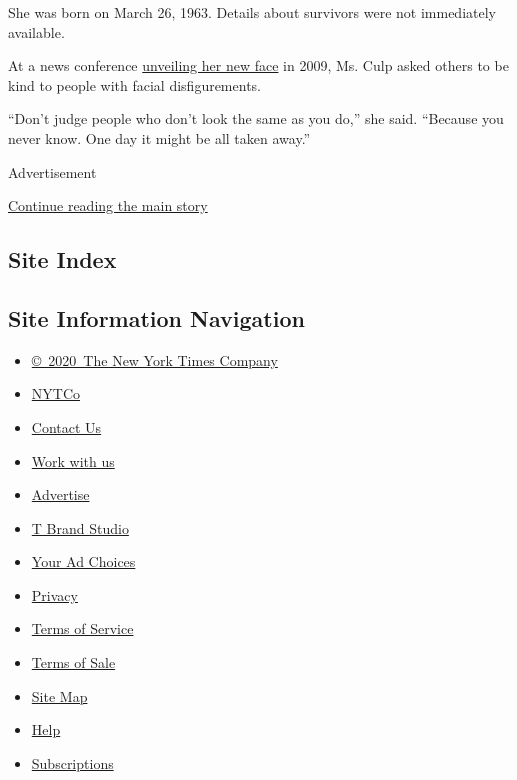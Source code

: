She was born on March 26, 1963. Details about survivors were not
immediately available.

At a news conference
\href{https://www.nytimes.com/2009/05/06/science/06face.html}{unveiling
her new face} in 2009, Ms. Culp asked others to be kind to people with
facial disfigurements.

``Don't judge people who don't look the same as you do,'' she said.
``Because you never know. One day it might be all taken away.''

Advertisement

\protect\hyperlink{after-bottom}{Continue reading the main story}

\hypertarget{site-index}{%
\subsection{Site Index}\label{site-index}}

\hypertarget{site-information-navigation}{%
\subsection{Site Information
Navigation}\label{site-information-navigation}}

\begin{itemize}
\tightlist
\item
  \href{https://help.nytimes.com/hc/en-us/articles/115014792127-Copyright-notice}{©~2020~The
  New York Times Company}
\end{itemize}

\begin{itemize}
\tightlist
\item
  \href{https://www.nytco.com/}{NYTCo}
\item
  \href{https://help.nytimes.com/hc/en-us/articles/115015385887-Contact-Us}{Contact
  Us}
\item
  \href{https://www.nytco.com/careers/}{Work with us}
\item
  \href{https://nytmediakit.com/}{Advertise}
\item
  \href{http://www.tbrandstudio.com/}{T Brand Studio}
\item
  \href{https://www.nytimes.com/privacy/cookie-policy\#how-do-i-manage-trackers}{Your
  Ad Choices}
\item
  \href{https://www.nytimes.com/privacy}{Privacy}
\item
  \href{https://help.nytimes.com/hc/en-us/articles/115014893428-Terms-of-service}{Terms
  of Service}
\item
  \href{https://help.nytimes.com/hc/en-us/articles/115014893968-Terms-of-sale}{Terms
  of Sale}
\item
  \href{https://spiderbites.nytimes.com}{Site Map}
\item
  \href{https://help.nytimes.com/hc/en-us}{Help}
\item
  \href{https://www.nytimes.com/subscription?campaignId=37WXW}{Subscriptions}
\end{itemize}
